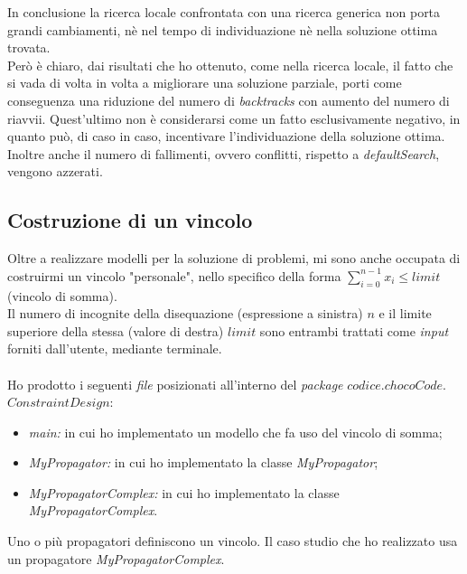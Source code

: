\noindent
In conclusione la ricerca locale confrontata con una ricerca generica non porta grandi cambiamenti, n\`e nel tempo di individuazione n\`e nella soluzione ottima trovata. \\
Per\`o \`e chiaro, dai risultati che ho ottenuto, come nella ricerca locale, il fatto che si vada di volta in volta a migliorare una soluzione parziale, porti come conseguenza una riduzione del numero di \textit{backtracks} con aumento del numero di riavvii. Quest'ultimo non \`e considerarsi come un fatto esclusivamente negativo, in quanto pu\`o, di caso in caso, incentivare l'individuazione della soluzione ottima. Inoltre anche il numero di fallimenti, ovvero conflitti, rispetto a \textit{defaultSearch}, vengono azzerati.

\subsection{Costruzione di un vincolo}
Oltre a realizzare modelli per la soluzione di problemi, mi sono anche occupata di costruirmi un vincolo "personale", nello specifico della forma $\sum_{i=0}^{n-1} x_i \leq limit$ (vincolo di somma).\\ Il numero di incognite della disequazione (espressione a sinistra) $n$  e il limite superiore della stessa (valore di destra) $limit$ sono entrambi trattati come \textit{input} forniti dall'utente, mediante terminale.\\\\
\noindent
Ho prodotto i seguenti \textit{file} posizionati all'interno del \textit{package} $codice.chocoCode.$ $ConstraintDesign$:
\begin{itemize}
\item \textit{main:} in cui ho implementato un modello che fa uso del vincolo di somma;
\item \textit{MyPropagator:} in cui ho implementato la classe \textit{MyPropagator};
\item \textit{MyPropagatorComplex:} in cui ho implementato la classe \textit{MyPropagatorComplex}. 
\end{itemize}
\noindent
Uno o pi\`u propagatori definiscono un vincolo. Il caso studio che ho realizzato usa un propagatore \textit{MyPropagatorComplex}.
